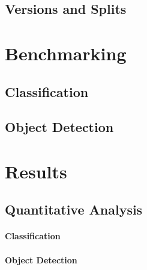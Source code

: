 \subsection{Versions and Splits}





\begin{figure}[htb!]
	
	\caption{}
	\label{fig:hypernym_distribution}
\end{figure}



\iffalse
\begin{figure}[htb!]
	
	\caption{}
	\label{fig:hypernym_distribution}
\end{figure}
\fi



\section{Benchmarking}
\label{sec:benchmarking}

\subsection{Classification}
\subsection{Object Detection}


\section{Results}
\label{sec:results}

\subsection{Quantitative Analysis}
\paragraph{Classification}
\paragraph{Object Detection}



\begin{figure}[htb!]
	\scalebox{0.8}{}
	\caption{}
	\label{fig:detection_experiment_1}
\end{figure}



